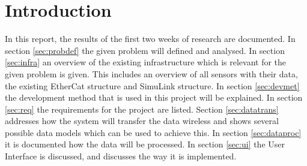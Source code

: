 \section{Introduction}
In this report, the results of the first two weeks of research are documented. In section \ref{sec:probdef} the given problem will defined and analysed. In section \ref{sec:infra} an overview of the existing infrastructure which is relevant for the given problem is given. This includes an overview of all sensors with their data, the existing EtherCat structure and SimuLink structure. In section \ref{sec:devmet} the development method that is used in this project will be explained. In section \ref{sec:req} the requirements for the project are listed. Section \ref{sec:datatrans} addresses how the system will transfer the data wireless and shows several possible data models which can be used to achieve this. In section \ref{sec:dataproc} it is documented how the data will be processed. In section \ref{sec:ui} the User Interface is discussed, and discusses the way it is implemented. 